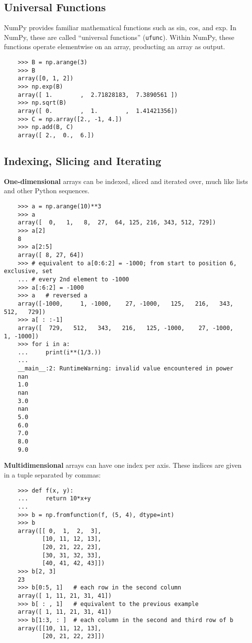 \documentclass[UTF8]{article}
\begin{document}
\subsection{Universal Functions}
NumPy provides familiar mathematical functions such as sin, cos, and exp. In NumPy, these are
called ``universal functions'' (\texttt{ufunc}). Within NumPy, these functions operate elementwise
on an array, producting an array as output.
\begin{verbatim}
    >>> B = np.arange(3)
    >>> B
    array([0, 1, 2])
    >>> np.exp(B)
    array([ 1.        ,  2.71828183,  7.3890561 ])
    >>> np.sqrt(B)
    array([ 0.        ,  1.        ,  1.41421356])
    >>> C = np.array([2., -1, 4.])
    >>> np.add(B, C)
    array([ 2.,  0.,  6.])
\end{verbatim}

\subsection{Indexing, Slicing and Iterating}
\textbf{One-dimensional} arrays can be indexed, sliced and iterated over, much like lists and other
Python sequences.
\begin{verbatim}
    >>> a = np.arange(10)**3
    >>> a
    array([  0,   1,   8,  27,  64, 125, 216, 343, 512, 729])
    >>> a[2]
    8
    >>> a[2:5]
    array([ 8, 27, 64])
    >>> # equivalent to a[0:6:2] = -1000; from start to position 6, exclusive, set
    ... # every 2nd element to -1000
    >>> a[:6:2] = -1000
    >>> a   # reversed a
    array([-1000,     1, -1000,    27, -1000,   125,   216,   343,   512,   729])
    >>> a[ : :-1]
    array([  729,   512,   343,   216,   125, -1000,    27, -1000,     1, -1000])
    >>> for i in a:
    ...     print(i**(1/3.))
    ...
    __main__:2: RuntimeWarning: invalid value encountered in power
    nan
    1.0
    nan
    3.0
    nan
    5.0
    6.0
    7.0
    8.0
    9.0
\end{verbatim}

\textbf{Multidimensional} arrays can have one index per axis. These indices are given in a tuple
separated by commas:
\begin{verbatim}
    >>> def f(x, y):
    ...     return 10*x+y
    ...
    >>> b = np.fromfunction(f, (5, 4), dtype=int)
    >>> b
    array([[ 0,  1,  2,  3],
           [10, 11, 12, 13],
           [20, 21, 22, 23],
           [30, 31, 32, 33],
           [40, 41, 42, 43]])
    >>> b[2, 3]
    23
    >>> b[0:5, 1]   # each row in the second column
    array([ 1, 11, 21, 31, 41])
    >>> b[ : , 1]   # equivalent to the previous example
    array([ 1, 11, 21, 31, 41])
    >>> b[1:3, : ]  # each column in the second and third row of b
    array([[10, 11, 12, 13],
           [20, 21, 22, 23]])
\end{verbatim}
\end{document}
